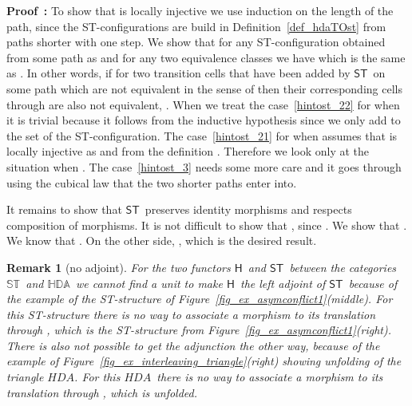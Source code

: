 \documentclass[submission,copyright,creativecommons]{eptcs}
\newtheorem{remark}[theorem]{Remark}
\newenvironment{proof}[1][\!\!\,]{\vspace{1ex}\noindent\textbf{Proof #1: }}{\hfill\vspace{2ex}}
\newcommand{\cp}[1]{}
\newcounter{case}
\newcommand\HDA{\ensuremath{\mathit{HDA}}}
\newcommand\HDAs{\ensuremath{\mathit{HDAs}}}
\newcommand\allST{\ensuremath{\mathbb{ST}}}
\newcommand\allHDA{\ensuremath{\mathbb{HDA}}}
\newcommand\stintoh{\ensuremath{\mathsf{H}}}
\newcommand\hintost{\ensuremath{\mathsf{ST}}}
\newcommand\categoryST{\ensuremath{\allST}}
\newcommand\categoryHDA{\ensuremath{\allHDA}}
\begin{document}
\begin{proof}
To show that  is locally injective we use induction on the length of the path, since the ST-configura\-tions are build in Definition~\ref{def_hdaTOst} from paths shorter with one step. We show that for any ST-configuration  obtained from some path as  and for any two equivalence classes  we have  which is the same as . In other words, if for two transition cells that have been added by \hintost\ on some path  which are not equivalent in the sense of  then their corresponding cells through  are also not equivalent, .
When we treat the case~\ref{hintost_22} for when  it is trivial because it follows from the inductive hypothesis since we only add to the  set of the ST-configuration.
The case~\ref{hintost_21} for when  assumes that  is locally injective as  and from the definition . Therefore we look only at the situation when .
The case~\ref{hintost_3} needs some more care and it goes through using the cubical law that the two shorter paths enter into.

It remains to show that \hintost\ preserves identity morphisms and respects composition of morphisms.
It is not difficult to show that , since .
We show that . We know that . On the other side, , which is the desired result.
\end{proof}


\begin{remark}[no adjoint]
For the two functors \stintoh\ and \hintost\ between the categories \categoryST\ and \categoryHDA\ we cannot find a unit to make \stintoh\ the left adjoint of \hintost\ because of the example of the ST-structure of Figure~\ref{fig_ex_asymconflict1}(middle). For this ST-structure there is no way to associate a morphism to its translation through , which is the ST-structure from Figure~\ref{fig_ex_asymconflict1}(right). There is also not possible to get the adjunction the other way, because of the example of Figure~\ref{fig_ex_interleaving_triangle}(right) showing unfolding of the triangle \HDA. For this \HDA\ there is no way to associate a morphism to its translation through , which is unfolded.
\end{remark}


\cp{What is the category of sculptures? And what is its relation with the category of \HDAs?
Sculptures are special morphisms (together with their respective objects) from the category of \HDAs. If we take such morphisms as objects, then what are the morphisms between sculptures?

Note that a bulk is a sculpture wrt.\ all other bulks of higher dimension. So there are many such morphism with the origin in a bulk. We are interested only in those sculpture morphisms which are \textit{simplistic}. What is their categorical characterization in the category \categoryHDA?
}
\end{document}
